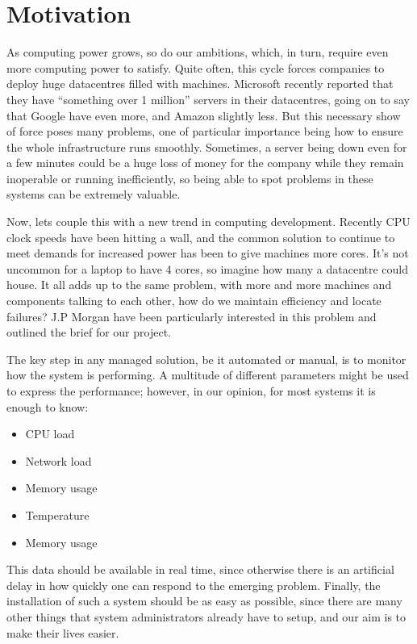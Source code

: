 \documentclass{l3proj}
\begin{document}
\section{Motivation}
\label{motivation}

As computing power grows, so do our ambitions, which, in turn, require even more computing power to satisfy. Quite often, this cycle forces companies to deploy huge datacentres filled with machines. Microsoft recently reported that they have ``something over 1 million''\cite{extremetech:2013:microsoft} servers in their datacentres, going on to say that Google have even more, and Amazon slightly less. But this necessary show of force poses many problems, one of particular importance being how to ensure the whole infrastructure runs smoothly. Sometimes, a server being down even for a few minutes could be a huge loss of money for the company while they remain inoperable or running inefficiently, so being able to spot problems in these systems can be extremely valuable.

Now, lets couple this with a new trend in computing development. Recently CPU clock speeds have been hitting a wall, and the common solution to continue to meet demands for increased power has been to give machines more cores. It's not uncommon for a laptop to have 4 cores, so imagine how many a datacentre could house. It all adds up to the same problem, with more and more machines and components talking to each other, how do we maintain efficiency and locate failures? J.P Morgan have been particularly interested in this problem and outlined the brief for our project.

The key step in any managed solution, be it automated or manual, is to monitor how the system is performing. A multitude of different parameters might be used to express the performance; however, in our opinion, for most systems it is enough to know:

\begin{itemize}
  \item CPU load
  \item Network load
  \item Memory usage
  \item Temperature
  \item Memory usage
\end{itemize}

This data should be available in real time, since otherwise there is an artificial delay in how quickly one can respond to the emerging problem. Finally, the installation of such a system should be as easy as possible, since there are many other things that system administrators already have to setup, and our aim is to make their lives easier.
\end{document}
